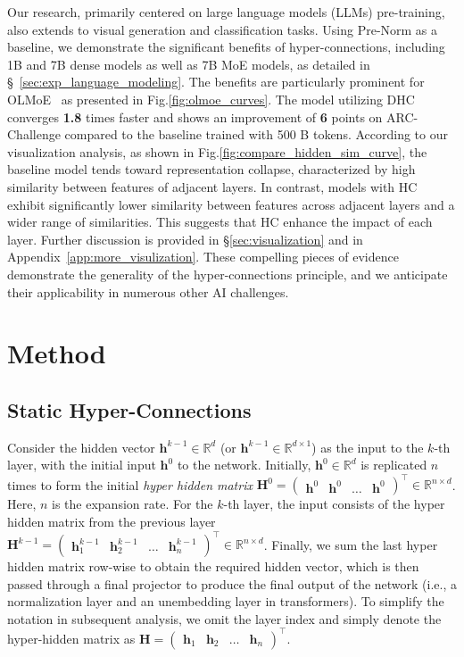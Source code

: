 \documentclass{article} %
\begin{document}
Our research, primarily centered on large language models (LLMs) pre-training, also extends to visual generation and classification tasks. Using Pre-Norm as a baseline, we demonstrate the significant benefits of hyper-connections, including 1B and 7B dense models as well as 7B MoE models, as detailed in \S~\ref{sec:exp_language_modeling}. The benefits are particularly prominent for OLMoE~\citep{muennighoff2024olmoeopenmixtureofexpertslanguage} as presented in Fig.\ref{fig:olmoe_curves}. The model utilizing DHC converges \textbf{1.8} times faster and shows an improvement of \textbf{6} points on ARC-Challenge compared to the baseline trained with 500 B tokens. According to our visualization analysis, as shown in Fig.\ref{fig:compare_hidden_sim_curve}, the baseline model tends toward representation collapse, characterized by high similarity between features of adjacent layers. In contrast, models with HC exhibit significantly lower similarity between features across adjacent layers and a wider range of similarities. This suggests that HC enhance the impact of each layer. Further discussion is provided in \S\ref{sec:visualization} and in Appendix~\ref{app:more_visulization}. 
These compelling pieces of evidence demonstrate the generality of the hyper-connections principle, and we anticipate their applicability in numerous other AI challenges.






\section{Method}
\subsection{Static Hyper-Connections}
Consider the hidden vector $\mathbf h^{k-1} \in \mathbb{R}^d$ (or $\mathbf h^{k-1} \in \mathbb{R}^{d \times 1}$) as the input to the $k$-th layer, with the initial input $\mathbf h^0$ to the network. Initially, $\mathbf h^0 \in \mathbb{R}^d$ is replicated $n$ times to form the initial \textit{hyper hidden matrix}
$\mathbf{H}^0 = \begin{pmatrix} \mathbf h^0 & \mathbf h^0 & \dots & \mathbf h^0 \end{pmatrix}^\intercal \in \mathbb{R}^{n\times d}$.  Here,
$n$ is the expansion rate.
For the $k$-th layer, the input consists of the hyper hidden matrix from the previous layer $\mathbf H^{k-1} = \begin{pmatrix}\mathbf h^{k-1}_1 & \mathbf h^{k-1}_2 & \dots & \mathbf h^{k-1}_n\end{pmatrix}^\intercal \in \mathbb{R}^{n\times d}$. Finally, we sum the last hyper hidden matrix row-wise to obtain the required hidden vector, which is then passed through a final projector to produce the final output of the network (i.e., a normalization layer and an unembedding layer in transformers). To simplify the notation in subsequent analysis, we omit the layer index and simply denote the hyper-hidden matrix as $\mathbf H = \begin{pmatrix}\mathbf h_1 & \mathbf h_2 & \dots & \mathbf h_n\end{pmatrix}^\intercal$.
\end{document}
